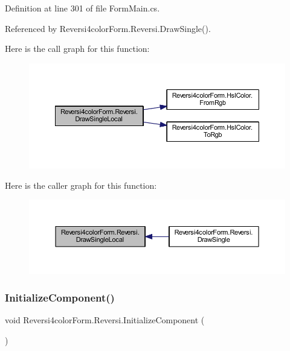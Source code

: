 Definition at line 301 of file Form\+Main.\+cs.



Referenced by Reversi4color\+Form.\+Reversi.\+Draw\+Single().

Here is the call graph for this function\+:\nopagebreak
\begin{figure}[H]
\begin{center}
\leavevmode
\includegraphics[width=350pt]{class_reversi4color_form_1_1_reversi_a82fb011304d47866a85a9092fe4be6b7_cgraph}
\end{center}
\end{figure}
Here is the caller graph for this function\+:\nopagebreak
\begin{figure}[H]
\begin{center}
\leavevmode
\includegraphics[width=350pt]{class_reversi4color_form_1_1_reversi_a82fb011304d47866a85a9092fe4be6b7_icgraph}
\end{center}
\end{figure}
\mbox{\label{class_reversi4color_form_1_1_reversi_a9eb7787e255c6aab7c75d6f0730e579e}} 
\subsubsection{\texorpdfstring{Initialize\+Component()}{InitializeComponent()}}
{\footnotesize\ttfamily void Reversi4color\+Form.\+Reversi.\+Initialize\+Component (\begin{DoxyParamCaption}{ }\end{DoxyParamCaption})\hspace{0.3cm}{\ttfamily [private]}}



